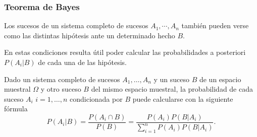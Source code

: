 \begin{frame}
\frametitle{Teorema de Bayes}
Los sucesos de un sistema completo de sucesos $A_1,\cdots,A_n$ también pueden verse como las distintas hipótesis ante un determinado hecho $B$.

En estas condiciones resulta útil poder calcular las probabilidades a posteriori $P(A_i|B)$ de cada una de las hipótesis.

\begin{teorema}[Bayes]
Dado un sistema completo de sucesos $A_1,\ldots,A_n$ y un suceso $B$ de un espacio muestral $\Omega$ y otro suceso $B$ del mismo espacio muestral, la probabilidad de cada suceso $A_i$ $i=1,\ldots,n$ condicionada por $B$ puede calcularse con la siguiente fórmula
\[
	P(A_i|B) = \frac{P(A_i\cap B)}{P(B)} = \frac{P(A_i)P(B|A_i)}{\sum_{i=1}^n P(A_i)P(B|A_i)}.
\]
\end{teorema}

\end{frame}


